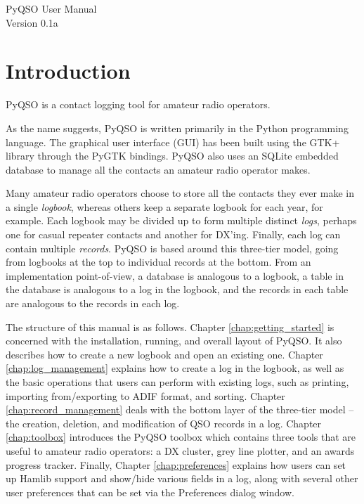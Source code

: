\documentclass[11pt, a4paper]{report}
\begin{document}
\begin{titlepage}
\begin{center}
\vspace*{5cm}
\huge{PyQSO User Manual}\\\vspace*{5cm}
\LARGE{Version 0.1a}
\end{center}
\end{titlepage}

\tableofcontents

\chapter{Introduction}\label{chap:introduction}
PyQSO is a contact logging tool for amateur radio operators.

As the name suggests, PyQSO is written primarily in the Python programming language. The graphical user interface (GUI) has been built using the GTK+ library through the PyGTK bindings. PyQSO also uses an SQLite embedded database to manage all the contacts an amateur radio operator makes.

Many amateur radio operators choose to store all the contacts they ever make in a single \textit{logbook}, whereas others keep a separate logbook for each year, for example. Each logbook may be divided up to form multiple distinct \textit{logs}, perhaps one for casual repeater contacts and another for DX'ing. Finally, each log can contain multiple \textit{records}. PyQSO is based around this three-tier model, going from logbooks at the top to individual records at the bottom. From an implementation point-of-view, a database is analogous to a logbook, a table in the database is analogous to a log in the logbook, and the records in each table are analogous to the records in each log.

The structure of this manual is as follows. Chapter \ref{chap:getting_started} is concerned with the installation, running, and overall layout of PyQSO. It also describes how to create a  new logbook and open an existing one. Chapter \ref{chap:log_management} explains how to create a log in the logbook, as well as the basic operations that users can perform with existing logs, such as printing, importing from/exporting to ADIF format, and sorting. Chapter \ref{chap:record_management} deals with the bottom layer of the three-tier model -- the creation, deletion, and modification of QSO records in a log. Chapter \ref{chap:toolbox} introduces the PyQSO toolbox which contains three tools that are useful to amateur radio operators: a DX cluster, grey line plotter, and an awards progress tracker. Finally, Chapter \ref{chap:preferences} explains how users can set up Hamlib support and show/hide various fields in a log, along with several other user preferences that can be set via the Preferences dialog window.
\end{document}
